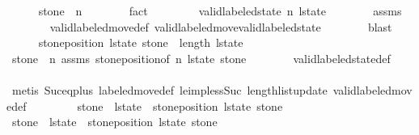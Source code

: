 \begin{isabellebody}
\ \ \ \ \isamarkupfalse%
\ {\isachardoublequoteopen}stone{\isacharprime}\ {\isacharless}\ n{\isachardoublequoteclose}\isanewline
\ \ \ \ \ \ \isamarkupfalse%
\ fact\isanewline
\ \ \isamarkupfalse%
\isanewline
\ \ \ \ \isamarkupfalse%
\ {\isachardoublequoteopen}valid{\isacharunderscore}labeled{\isacharunderscore}state\ n\ l{\isacharunderscore}state{\isacharprime}{\isachardoublequoteclose}\isanewline
\ \ \ \ \ \ \isamarkupfalse%
\ assms\isanewline
\ \ \ \ \ \ \isamarkupfalse%
\ valid{\isacharunderscore}labeled{\isacharunderscore}move{\isacharunderscore}def\ valid{\isacharunderscore}labeled{\isacharunderscore}move{\isacharunderscore}valid{\isacharunderscore}labeled{\isacharunderscore}state\isanewline
\ \ \ \ \ \ \isamarkupfalse%
\ blast\isanewline
\ \ \isamarkupfalse%
\isanewline
\ \ \ \ \isamarkupfalse%
\ {\isachardoublequoteopen}stone{\isacharunderscore}position\ l{\isacharunderscore}state\ stone{\isacharprime}\ {\isacharless}\ length\ l{\isacharunderscore}state{\isacharprime}{\isachardoublequoteclose}\isanewline
\ \ \ \ \ \ \isamarkupfalse%
\ {\isacartoucheopen}stone{\isacharprime}\ {\isacharless}\ n{\isacartoucheclose}\ assms{\isacharparenleft}{}{\isacharminus}{}{\isacharparenright}\ stone{\isacharunderscore}position{\isacharbrackleft}of\ n\ l{\isacharunderscore}state\ stone{\isacharprime}{\isacharbrackright}\isanewline
\ \ \ \ \ \ \isamarkupfalse%
\ valid{\isacharunderscore}labeled{\isacharunderscore}state{\isacharunderscore}def\isanewline
\ \ \ \ \ \ \isamarkupfalse%
\ {\isacharparenleft}metis\ Suc{\isacharunderscore}eq{\isacharunderscore}plus{}\ labeled{\isacharunderscore}move{\isacharunderscore}def\ le{\isacharunderscore}imp{\isacharunderscore}less{\isacharunderscore}Suc\ length{\isacharunderscore}list{\isacharunderscore}update\ valid{\isacharunderscore}labeled{\isacharunderscore}move{\isacharprime}{\isacharunderscore}def{\isacharparenright}\isanewline
\ \ \isamarkupfalse%
\isanewline
\ \ \ \ \isamarkupfalse%
\ {\isachardoublequoteopen}stone{\isacharprime}\ {\isasymin}\ l{\isacharunderscore}state{\isacharprime}\ {\isacharbang}\ stone{\isacharunderscore}position\ l{\isacharunderscore}state\ stone{\isacharprime}{\isachardoublequoteclose}\isanewline
\ \ \ \ \isamarkupfalse%
{\isacharminus}\isanewline
\ \ \ \ \ \ \isamarkupfalse%
\ {\isachardoublequoteopen}stone{\isacharprime}\ {\isasymin}\ l{\isacharunderscore}state\ {\isacharbang}\ stone{\isacharunderscore}position\ l{\isacharunderscore}state\ stone{\isacharprime}{\isachardoublequoteclose}\ \isanewline

\end{isabellebody}
